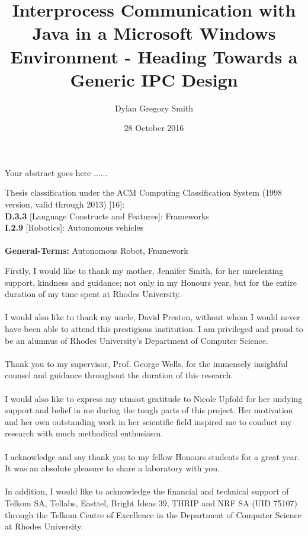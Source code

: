 \documentclass[12pt] {newrucsthesis}    %
\begin{document}
  \title{ Interprocess Communication with Java in a Microsoft Windows Environment - Heading Towards a Generic IPC Design }
  \author{ Dylan Gregory Smith  }
  \date { 28 October 2016}
  \maketitle

  \abstract
  Your abstract goes here ......


  \acm    %
  Thesis classification under the ACM Computing Classification System (1998 version, valid
  through 2013) [16]:\\
  \textbf{D.3.3} [Language Constructs and Features]: Frameworks\\
  \textbf{I.2.9} [Robotics]: Autonomous vehicles\\
  \\
  \textbf{General-Terms:} Autonomous Robot, Framework


  \ack
    Firstly, I would like to thank my mother, Jennifer Smith, for her unrelenting support,
    kindness and guidance; not only in my Honours year, but for the entire duration of
    my time spent at Rhodes University.
    \\\\
    I would also like to thank my uncle, David Preston, without whom I would never have
    been able to attend this prestigious institution. I am privileged and proud to be
    an alumnus of Rhodes University's Department of Computer Science.
    \\\\
    Thank you to my supervisor, Prof. George Wells, for the immensely insightful
    counsel and guidance throughout the duration of this research.
    \\\\
    I would also like to express my utmost gratitude to Nicole Upfold for her undying
    support and belief in me during the tough parts of this project. Her motivation and her
    own outstanding work in her scientific field inspired me to conduct my research
    with much methodical enthusiasm.
    \\\\
    I acknowledge and say thank you to my fellow Honours students for a great year.
    It was an absolute pleasure to share a laboratory with you.
    \\\\
    In addition, I would like to acknowledge the financial and technical support of Telkom SA, Tellabs,
    Easttel, Bright Ideas 39, THRIP and NRF SA (UID 75107) through the Telkom Centre
    of Excellence in the Department of Computer Science at Rhodes University.
    \newpage
\end{document}
